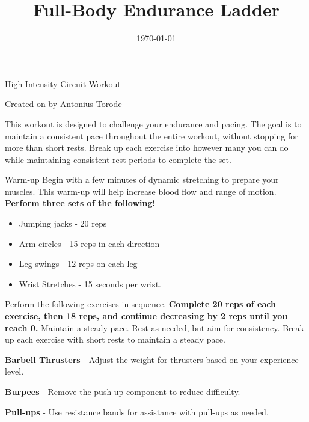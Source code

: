\documentclass{article}
\newcounter{workout}
\newcounter{exercise}
\renewcommand{\maketitle}{
	\begin{center}
		{\Huge\bfseries\thetitle}
		
		\vspace{0.5em}
		
		High-Intensity Circuit Workout
		
		\vspace{0.5em}
		
		Created on \thedate\hspace{0.5em}by Antonius Torode
	\end{center}
}
\begin{document}
	\begin{tcolorbox}[colback=gray!15,colframe=black,enforce breakable,pad at break*=5mm,boxrule=0.5mm]
		
		\title{Full-Body Endurance Ladder}
		\date{\today}
		\maketitle
		
		This workout is designed to challenge your endurance and pacing. The goal is to maintain a consistent pace throughout the entire workout, without stopping for more than short rests. Break up each exercise into however many you can do while maintaining consistent rest periods to complete the set. 
		
		\begin{workoutbox}{Warm-up}
			Begin with a few minutes of dynamic stretching to prepare your muscles. This warm-up will help increase blood flow and range of motion. \textbf{Perform three sets of the following!}
			
			\begin{itemize}[label=\textcolor{blue!70}{\textbullet}, itemsep=0pt]
				\item Jumping jacks - 20 reps
				\item Arm circles - 15 reps in each direction
				\item Leg swings - 12 reps on each leg
				\item Wrist Stretches - 15 seconds per wrist.
			\end{itemize}
		\end{workoutbox}
		
		Perform the following exercises in sequence. \textbf{Complete 20 reps of each exercise, then 18 reps, and continue decreasing by 2 reps until you reach 0.} Maintain a steady pace. Rest as needed, but aim for consistency. Break up each exercise with short rests to maintain a steady pace.
		
		\begin{exercisebox}
			\textbf{Barbell Thrusters} - Adjust the weight for thrusters based on your experience level.
		\end{exercisebox}
		
		\begin{exercisebox}
			\textbf{Burpees} - Remove the push up component to reduce difficulty.
		\end{exercisebox}
		
		\begin{exercisebox}
			\textbf{Pull-ups} - Use resistance bands for assistance with pull-ups as needed. 
		\end{exercisebox}
		

\end{tcolorbox}
\end{document}
